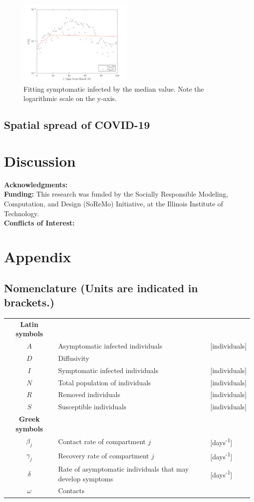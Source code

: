\documentclass[11pt]{article}
\begin{document}
		\begin{figure}[h!]
			\centering
			\includegraphics[width=0.5\textwidth]{cases.pdf}
			\caption{Fitting symptomatic infected by the median value.
				Note the logarithmic scale on the y-axis.}
			\label{fig:fit}
		\end{figure}
	
	\subsection{Spatial spread of COVID-19}

\section{Discussion}
	
	\textbf{Acknowledgments:} \\
	\textbf{Funding:}
	This research was funded by the Socially Responsible Modeling, Computation, and Design (SoReMo) Initiative, at the Illinois Institute of Technology. \\
	\textbf{Conflicts of Interest:}
	
\section*{Appendix}
	\subsection*{Nomenclature (Units are indicated in brackets.)}
		\begin{longtable}{c l l}
			\textbf{Latin symbols} & & \\
			$A$ & Asymptomatic infected individuals & [individuals] \\
			$D$ & Diffusivity & \\
			$I$ & Symptomatic infected individuals & [individuals] \\
			$N$ & Total population of individuals & [individuals] \\
			$R$ & Removed individuals & [individuals] \\
			$S$ & Susceptible individuals & [individuals] \\
			\textbf{Greek symbols} & & \\
			$\beta_j$ & Contact rate of compartment $j$ & [days\textsuperscript{-1}] \\
			$\gamma_j$ & Recovery rate of compartment $j$ & [days\textsuperscript{-1}] \\
			$\delta$ & Rate of asymptomatic individuals that may develop symptoms & [days\textsuperscript{-1}] \\
			$\omega$ & Contacts & 
		\end{longtable}


\end{document}
